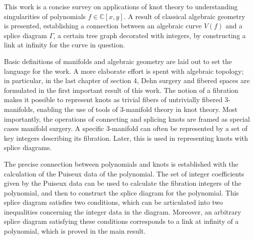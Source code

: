 \documentclass[finnish, 12pt, a4paper, sci, utf8, a-1b, online]{aaltothesis}
\theoremstyle{definition}
\theoremstyle{plain}
\theoremstyle{remark}
\newcommand{\C}{\mathbb{C}}
\begin{document}




\newpage
\begin{abstractpage}[english] %
This work is a concise survey on applications of knot theory to understanding singularities of polynomials $f\in\C[x,y]$. A result of classical algebraic geometry is presented, establishing a connection between an algebraic curve $V(f)$ and a splice diagram $\Gamma$, a certain tree graph decorated with integers, by constructing a link at infinity for the curve in question.

Basic definitions of manifolds and algebraic geometry are laid out to set the language for the work. A more elaborate effort is spent with algebraic topology; in particular, in the last chapter of section 4, Dehn surgery and fibered spaces are formulated in the first important result of this work. The notion of a fibration makes it possible to represent knots as trivial fibers of untrivially fibered 3-manifolds, enabling the use of tools of 3-manifold theory in knot theory. Most importantly, the operations of connecting and splicing knots are framed as special cases manifold surgery. A specific 3-manifold can often be represented by a set of key integers describing its fibration. Later, this is used in representing knots with splice diagrams.

The precise connection between polynomials and knots is established with the calculation of the Puiseux data of the polynomial. The set of integer coefficients given by the Puiseux data can be used to calculate the fibration integers of the polynomial, and then to construct the splice diagram for the polynomial. This splice diagram satisfies two conditions, which can be articulated into two inequalities concerning the integer data in the diagram. Moreover, an arbitrary splice diagram satisfying these conditions corresponds to a link at infinity of a polynomial, which is proved in the main result.
\end{abstractpage}
\end{document}
